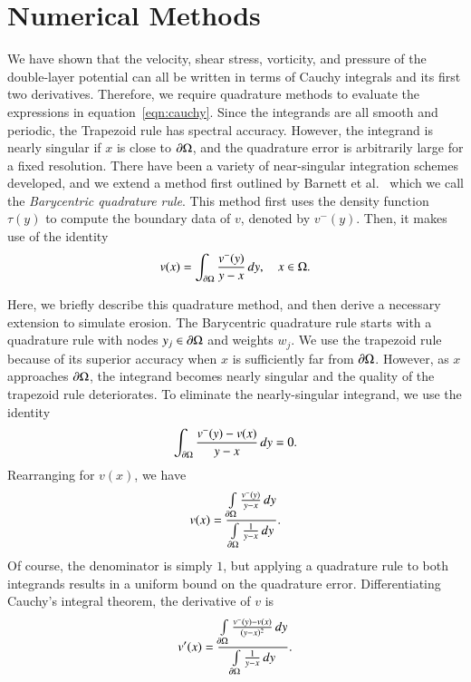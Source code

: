 \documentclass[preprint, 10pt]{elsarticle}
\begin{document}
\section{Numerical Methods}
\label{s:method}
We have shown that the velocity, shear stress, vorticity, and pressure
of the double-layer potential can all be written in terms of Cauchy
integrals and its first two derivatives.  Therefore, we require
quadrature methods to evaluate the expressions in
equation~\eqref{eqn:cauchy}.  Since the integrands are all smooth and
periodic, the Trapezoid rule has spectral accuracy.  However, the
integrand is nearly singular if $x$ is close to ${\partial}\Omega$, and the
quadrature error is arbitrarily large for a fixed resolution.  There
have been a variety of near-singular integration schemes developed, and
we extend a method first outlined by Barnett et
al.~\cite{bar-wu-vee2015} which we call the {\em Barycentric quadrature
rule}.  This method first uses the density function $\tau(y)$ to compute
the boundary data of $v$, denoted by $v^-(y)$.  Then, it makes use of
the identity
\begin{align}
  v(x) = \int_{{\partial}\Omega} \frac{v^{-}(y)}{y-x} \, dy, 
  \quad x \in \Omega.
\end{align}

Here, we briefly describe this quadrature method, and then derive a
necessary extension to simulate erosion.  The Barycentric quadrature
rule starts with a quadrature rule with nodes $y_j \in {\partial}\Omega$ and
weights $w_j$. We use the trapezoid rule because of its superior
accuracy when $x$ is sufficiently far from ${\partial}\Omega$.  However, as $x$
approaches ${\partial}\Omega$, the integrand becomes nearly singular and the
quality of the trapezoid rule deteriorates. To eliminate the
nearly-singular integrand, we use the identity
\begin{align}
  \int_{{\partial}\Omega} \frac{v^{-}(y) - v(x)}{y - x} \,dy = 0.
\end{align}
Rearranging for $v(x)$, we have
\begin{align}
  v(x) = \frac{\int\limits_{{\partial}\Omega} \frac{v^{-}(y)}{y-x}\, dy}
    {\int\limits_{{\partial}\Omega} \frac{1}{y-x}\, dy}.
\end{align}
Of course, the denominator is simply $1$, but applying a quadrature rule
to both integrands results in a uniform bound on the quadrature error.
Differentiating Cauchy's integral theorem, the derivative of $v$ is
\begin{align}
  v'(x) = \frac{\int\limits_{{\partial}\Omega} \frac{v^{-}(y) - v(x)}{(y-x)^2}\, dy}
    {\int\limits_{{\partial}\Omega} \frac{1}{y-x}\, dy}.
\end{align}
\end{document}
